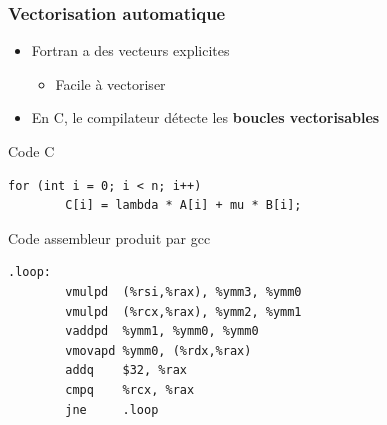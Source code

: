 \documentclass[xcolor={x11names,svgnames}]{beamer}
\begin{document}
\begin{frame}[fragile=singleslide]
  \frametitle{Vectorisation automatique}

  \begin{itemize}
  \item Fortran a des vecteurs explicites
    \begin{itemize}
    \item Facile à vectoriser
    \end{itemize}
    \item En C, le compilateur détecte les \textbf{boucles vectorisables}

  \end{itemize}

\begin{exampleblock}{Code C}
\begin{verbatim}
for (int i = 0; i < n; i++)
        C[i] = lambda * A[i] + mu * B[i];
\end{verbatim}
\end{exampleblock}

\begin{alertblock}{Code assembleur produit par gcc}

\begin{verbatim}
.loop:
        vmulpd  (%rsi,%rax), %ymm3, %ymm0    
        vmulpd  (%rcx,%rax), %ymm2, %ymm1
        vaddpd  %ymm1, %ymm0, %ymm0
        vmovapd %ymm0, (%rdx,%rax)
        addq    $32, %rax
        cmpq    %rcx, %rax
        jne     .loop
\end{verbatim}
\end{alertblock}%
\end{frame}


\end{document}

